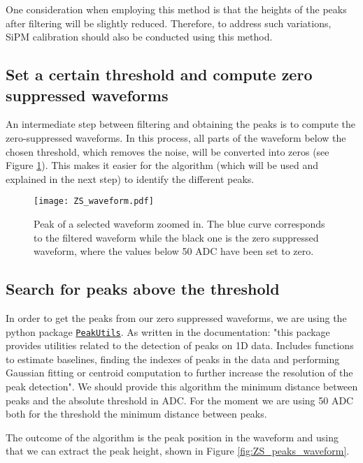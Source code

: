 \documentclass[11pt,a4paper,english,oneside, pdf]{article}
\begin{document}
	One consideration when employing this method is that the heights of the peaks after filtering will be slightly reduced. Therefore, to address such variations, SiPM calibration should also be conducted using this method.
	
	\subsection*{Set a certain threshold and compute zero suppressed waveforms}
	
	An intermediate step between filtering and obtaining the peaks is to compute the zero-suppressed waveforms. In this process, all parts of the waveform below the chosen threshold, which removes the noise, will be converted into zeros (see Figure \ref{fig:ZS_waveform}). This makes it easier for the algorithm (which will be used and explained in the next step) to identify the different peaks.
	
	\begin{figure}[!h]
		\begin{center}
			\texttt{[image: ZS\_waveform.pdf]}
			\caption{Peak of a selected waveform zoomed in. The blue curve corresponds to the filtered waveform while the black one is the zero suppressed waveform, where the values below 50 ADC have been set to zero.}
			\label{fig:ZS_waveform}
		\end{center}
	\end{figure}
	
	\subsection*{Search for peaks above the threshold}
	
	In order to get the peaks from our zero suppressed waveforms, we are using the python package \href{https://pypi.org/project/PeakUtils/}{\texttt{PeakUtils}}. As written in the documentation: "this package provides utilities related to the detection of peaks on 1D data. Includes functions to estimate baselines, finding the indexes of peaks in the data and performing Gaussian fitting or centroid computation to further increase the resolution of the peak detection". We should provide this algorithm the minimum distance between peaks and the absolute threshold in ADC. For the moment we are using 50 ADC both for the threshold the minimum distance between peaks.
	
	The outcome of the algorithm is the peak position in the waveform and using that we can extract the peak height, shown in Figure \ref{fig:ZS_peaks_waveform}.
	
\end{document}
